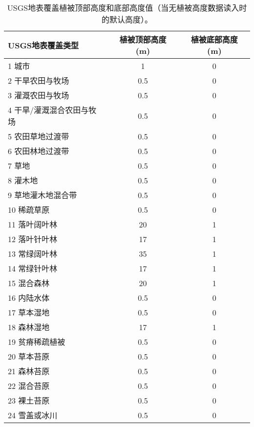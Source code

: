 \begin{table}[htbp]
    \centering
    \caption{USGS地表覆盖植被顶部高度和底部高度值（当无植被高度数据读入时的默认高度）。}
    \label{tab:USGS地表覆盖植被顶部高度和底部高度值}
    \begin{tabular}{@{}lcc@{}}
    \toprule
    USGS地表覆盖类型     & 植被顶部高度 (m) & 植被底部高度 (m) \\ \midrule
    1 城市           & 1          & 0          \\
    2 干旱农田与牧场      & 0.5        & 0          \\
    3 灌溉农田与牧场      & 0.5        & 0          \\
    4 干旱/灌溉混合农田与牧场 & 0.5        & 0          \\
    5 农田草地过渡带      & 0.5        & 0          \\
    6 农田林地过渡带      & 0.5        & 0          \\
    7 草地           & 0.5        & 0          \\
    8 灌木地          & 0.5        & 0          \\
    9 草地灌木地混合带     & 0.5        & 0          \\
    10 稀疏草原        & 0.5        & 0          \\
    11 落叶阔叶林       & 20         & 1          \\
    12 落叶针叶林       & 17         & 1          \\
    13 常绿阔叶林       & 35         & 1          \\
    14 常绿针叶林       & 17         & 1          \\
    15 混合森林        & 20         & 1          \\
    16 内陆水体        & 0.5        & 0          \\
    17 草本湿地        & 0.5        & 0          \\
    18 森林湿地        & 17         & 1          \\
    19 贫瘠稀疏植被      & 0.5        & 0          \\
    20 草本苔原        & 0.5        & 0          \\
    21 森林苔原        & 0.5        & 0          \\
    22 混合苔原        & 0.5        & 0          \\
    23 裸土苔原        & 0.5        & 0          \\
    24 雪盖或冰川       & 0.5        & 0          \\ \bottomrule
    \end{tabular}
\end{table}

